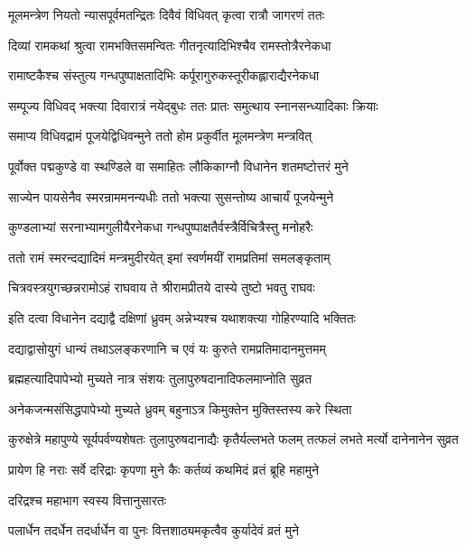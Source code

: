 \twolineshloka
{मूलमन्त्रेण नियतो न्यासपूर्वमतन्द्रितः}
{दिवैवं विधिवत् कृत्वा रात्रौ जागरणं ततः}%

\twolineshloka
{दिव्यां रामकथां श्रुत्वा रामभक्तिसमन्वितः}
{गीतनृत्यादिभिश्चैव रामस्तोत्रैरनेकधा}%

\twolineshloka
{रामाष्टकैश्च संस्तुत्य गन्धपुष्पाक्षतादिभिः}
{कर्पूरागुरुकस्तूरीकह्लाराद्यैरनेकधा}%

\twolineshloka
{सम्पूज्य विधिवद् भक्त्या दिवारात्रं नयेद्बुधः}
{ततः प्रातः समुत्थाय स्नानसन्ध्यादिकाः क्रियाः}%

\twolineshloka
{समाप्य विधिवद्रामं पूजयेद्विधिवन्मुने}
{ततो होम प्रकुर्वीत मूलमन्त्रेण मन्त्रवित्}%

\twolineshloka
{पूर्वोक्त पद्मकुण्डे वा स्थण्डिले वा समाहितः}
{लौकिकाग्नौ विधानेन शतमष्टोत्तरं मुने}%

\twolineshloka
{साज्येन पायसेनैव स्मरन्राममनन्यधीः}
{ततो भक्त्या सुसन्तोष्य आचार्यं पूजयेन्मुने}%

\twolineshloka
{कुण्डलाभ्यां सरनाभ्यामगुलीयैरनेकधा}
{गन्धपुष्पाक्षतैर्वस्त्रैर्विचित्रैस्तु मनोहरैः}%

\twolineshloka
{ततो रामं स्मरन्दद्यादिमं मन्त्रमुदीरयेत्}
{इमां स्वर्णमयीं रामप्रतिमां समलङ्कृताम्}%

\twolineshloka
{चित्रवस्त्रयुगच्छन्नरामोऽहं राघवाय ते}
{श्रीरामप्रीतये दास्ये तुष्टो भवतु राघवः}%

\twolineshloka
{इति दत्वा विधानेन दद्याद्वै दक्षिणां ध्रुवम्}
{अन्नेभ्यश्च यथाशक्त्या गोहिरण्यादि भक्तितः}%

\twolineshloka
{दद्याद्वासोयुगं धान्यं तथाऽलङ्करणानि च}
{एवं यः कुरुते रामप्रतिमादानमुत्तमम्}%

\twolineshloka
{ब्रह्महत्यादिपापेभ्यो मुच्यते नात्र संशयः}
{तुलापुरुषदानादिफलमाप्नोति सुव्रत}%

\twolineshloka
{अनेकजन्मसंसिद्धपापेभ्यो मुच्यते ध्रुवम्}
{बहुनाऽत्र किमुक्तेन मुक्तिस्तस्य करे स्थिता}%

\threelineshloka
{कुरुक्षेत्रे महापुण्ये सूर्यपर्वण्यशेषतः}
{तुलापुरुषदानाद्यैः कृतैर्यल्लभते फलम्}
{तत्फलं लभते मर्त्यो दानेनानेन सुव्रत}%

\twolineshloka
{प्रायेण हि नराः सर्वे दरिद्राः कृपणा मुने}
{कैः कर्तव्यं कथमिदं व्रतं ब्रूहि महामुने}%

\onelineshloka
{दरिद्रश्च महाभाग स्वस्य वित्तानुसारतः}%

\twolineshloka
{पलार्धेन तदर्धेन तदर्धार्धेन वा पुनः}
{वित्तशाठ्यमकृत्वैव कुर्यादेवं व्रतं मुने}%

